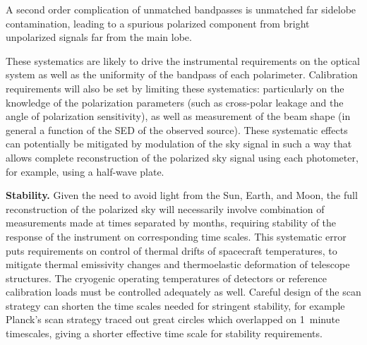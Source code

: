 
A second order complication of unmatched bandpasses is unmatched far sidelobe contamination, leading to a spurious polarized component from bright unpolarized signals far from the main lobe.


These systematics are likely to drive the instrumental
requirements on the optical system as well as the uniformity of the
bandpass of each polarimeter.  Calibration requirements will also be
set by limiting these systematics: particularly on the
knowledge of the polarization parameters (such as cross-polar leakage
and the angle of polarization sensitivity), as well as measurement of
the beam shape (in general a function of the SED of the observed source).
These systematic effects can potentially be mitigated by modulation of the sky signal in
such a way that allows complete reconstruction of the 
polarized sky signal using each photometer, for example, using a
half-wave plate.  

\textbf{Stability.}  Given the need to avoid light from the Sun, Earth, and Moon, the full reconstruction 
of the polarized sky will necessarily involve combination of measurements made at times
separated by months, requiring stability of the response of the instrument on corresponding time scales.  
This systematic error puts requirements on control of thermal drifts of spacecraft temperatures, to
mitigate thermal emissivity changes and thermoelastic deformation of telescope structures.  
The cryogenic operating temperatures of detectors or reference calibration loads must be controlled
adequately as well. Careful design of the scan strategy can shorten the time
scales needed for stringent stability, for example Planck's scan strategy traced out great circles which overlapped on
1~minute timescales, giving a shorter effective time scale for stability requirements. 

